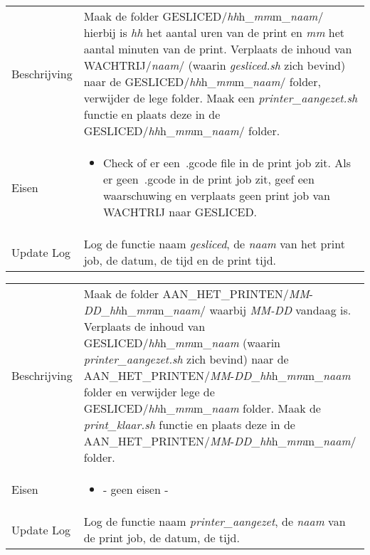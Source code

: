 \documentclass{article}
\begin{document}
\begin{table}[H]
    \centering
    \begin{tabular}%
    {>{\raggedright\arraybackslash}p{}%
    |>{\raggedright\arraybackslash}p{}}
    \rowcolor{myblue} \multicolumn{2}{c}{\rule{0pt}{13pt}Functie: {\Large gesliced.sh}} \\\hline
    Beschrijving & Maak de folder GESLICED/\textit{hh}h\_\textit{mm}m\_\textit{naam}/ hierbij is \textit{hh} het aantal uren van de print en \textit{mm} het aantal minuten van de print. Verplaats de inhoud van WACHTRIJ/\textit{naam}/ (waarin \textit{gesliced.sh} zich bevind) naar de GESLICED/\textit{hh}h\_\textit{mm}m\_\textit{naam}/ folder, verwijder de lege folder. Maak een \textit{printer\_aangezet.sh} functie en plaats deze in de GESLICED/\textit{hh}h\_\textit{mm}m\_\textit{naam}/ folder.\\
    Eisen & 
    \begin{itemize} 
\item Check of er een~.gcode file in de print job zit. Als er geen~.gcode in de print job zit, geef een waarschuwing en verplaats geen print job van WACHTRIJ naar GESLICED.
\end{itemize} \\
    Update Log& Log de functie naam \textit{gesliced}, de \textit{naam} van het print job, de datum, de tijd en de print tijd.\\
    \end{tabular}
\end{table}

\begin{table}[H]
    \centering
    \begin{tabular}%
    {>{\raggedright\arraybackslash}p{}%
    |>{\raggedright\arraybackslash}p{}}
    \rowcolor{myblue} \multicolumn{2}{c}{\rule{0pt}{13pt}Functie: {\Large printer\_aangezet.sh}} \\\hline
    Beschrijving & Maak de folder AAN\_HET\_PRINTEN/\textit{MM}-\textit{DD}\_\textit{hh}h\_\textit{mm}m\_\textit{naam}/ waarbij \textit{MM-DD} vandaag is. Verplaats de inhoud van GESLICED/\textit{hh}h\_\textit{mm}m\_\textit{naam} (waarin \textit{printer\_aangezet.sh} zich bevind) naar de AAN\_HET\_PRINTEN/\textit{MM}-\textit{DD}\_\textit{hh}h\_\textit{mm}m\_\textit{naam} folder en verwijder lege de GESLICED/\textit{hh}h\_\textit{mm}m\_\textit{naam} folder. Maak de \textit{print\_klaar.sh} functie en plaats deze in de AAN\_HET\_PRINTEN/\textit{MM}-\textit{DD}\_\textit{hh}h\_\textit{mm}m\_\textit{naam}/ folder.\\
    Eisen & 
    \begin{itemize} 
\item - geen eisen -
\end{itemize} \\
  Update Log&Log de functie naam \textit{printer\_aangezet}, de \textit{naam} van de print job, de datum, de tijd.\\
    \end{tabular}
\end{table}
\end{document}
